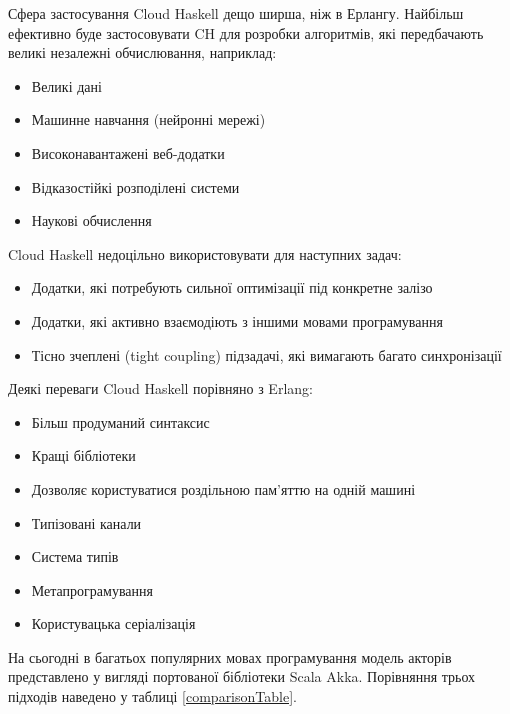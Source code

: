 \documentclass[12pt]{article}
\begin{document}
Сфера застосування Cloud Haskell дещо ширша, ніж в Ерлангу. Найбільш ефективно буде застосовувати CH для 
розробки алгоритмів, які передбачають великі незалежні обчислювання, наприклад:
\begin{itemize}
\item Великі дані
\item Машинне навчання (нейронні мережі)
\item Високонавантажені веб-додатки
\item Відказостійкі розподілені системи
\item Наукові обчислення
\end{itemize}

Cloud Haskell недоцільно використовувати для наступних задач:
\begin{itemize}
\item Додатки, які потребують сильної оптимізації під конкретне залізо
\item Додатки, які активно взаємодіють з іншими мовами програмування
\item Тісно зчеплені (tight coupling) підзадачі, які вимагають багато синхронізації
\end{itemize}

Деякі переваги Cloud Haskell порівняно з Erlang:
\begin{itemize}
\item Більш продуманий синтаксис
\item Кращі бібліотеки
\item Дозволяє користуватися роздільною пам'яттю на одній машині
\item Типізовані канали
\item Система типів
\item Метапрограмування
\item Користувацька серіалізація
\end{itemize}

На сьогодні в багатьох популярних мовах програмування модель акторів представлено у вигляді портованої 
бібліотеки Scala Akka. Порівняння трьох підходів наведено у таблиці \ref{comparisonTable}.
\end{document}
